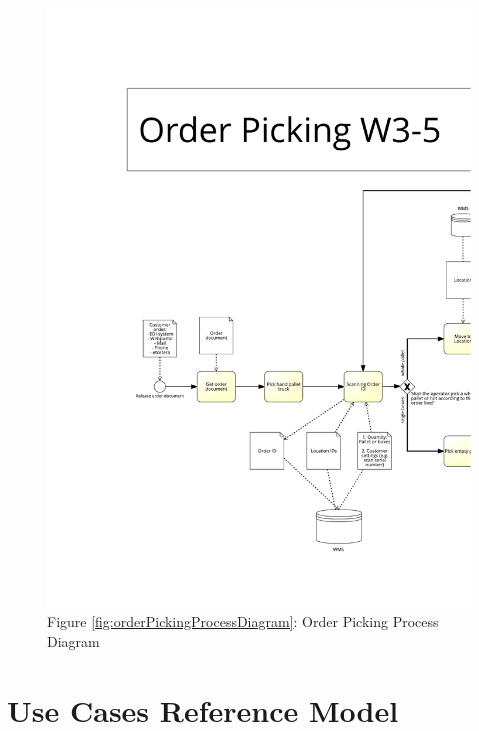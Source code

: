 \begin{appendices}
\begin{figure}
	\includegraphics[width=\textwidth, page=4]{images/OrderPickingW3-5}
	\caption*{Figure \ref{fig:orderPickingProcessDiagram}: Order Picking Process Diagram \citep{image:logwearOrderPicking}}
\end{figure}

\clearpage

\section{Use Cases Reference Model} \label{sec:useCasesReferenceModel}


\end{appendices}
